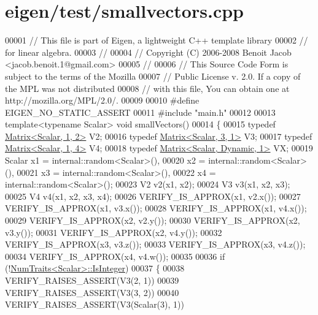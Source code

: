 \hypertarget{eigen_2test_2smallvectors_8cpp_source}{}\section{eigen/test/smallvectors.cpp}
\label{eigen_2test_2smallvectors_8cpp_source}

\begin{DoxyCode}
00001 \textcolor{comment}{// This file is part of Eigen, a lightweight C++ template library}
00002 \textcolor{comment}{// for linear algebra.}
00003 \textcolor{comment}{//}
00004 \textcolor{comment}{// Copyright (C) 2006-2008 Benoit Jacob <jacob.benoit.1@gmail.com>}
00005 \textcolor{comment}{//}
00006 \textcolor{comment}{// This Source Code Form is subject to the terms of the Mozilla}
00007 \textcolor{comment}{// Public License v. 2.0. If a copy of the MPL was not distributed}
00008 \textcolor{comment}{// with this file, You can obtain one at http://mozilla.org/MPL/2.0/.}
00009 
00010 \textcolor{preprocessor}{#define EIGEN\_NO\_STATIC\_ASSERT}
00011 \textcolor{preprocessor}{#include "main.h"}
00012 
00013 \textcolor{keyword}{template}<\textcolor{keyword}{typename} Scalar> \textcolor{keywordtype}{void} smallVectors()
00014 \{
00015   \textcolor{keyword}{typedef} \hyperlink{group___core___module_class_eigen_1_1_matrix}{Matrix<Scalar, 1, 2>} V2;
00016   \textcolor{keyword}{typedef} \hyperlink{group___core___module}{Matrix<Scalar, 3, 1>} V3;
00017   \textcolor{keyword}{typedef} \hyperlink{group___core___module_class_eigen_1_1_matrix}{Matrix<Scalar, 1, 4>} V4;
00018   \textcolor{keyword}{typedef} \hyperlink{group___core___module}{Matrix<Scalar, Dynamic, 1>} VX;
00019   Scalar x1 = internal::random<Scalar>(),
00020          x2 = internal::random<Scalar>(),
00021          x3 = internal::random<Scalar>(),
00022          x4 = internal::random<Scalar>();
00023   V2 v2(x1, x2);
00024   V3 v3(x1, x2, x3);
00025   V4 v4(x1, x2, x3, x4);
00026   VERIFY\_IS\_APPROX(x1, v2.x());
00027   VERIFY\_IS\_APPROX(x1, v3.x());
00028   VERIFY\_IS\_APPROX(x1, v4.x());
00029   VERIFY\_IS\_APPROX(x2, v2.y());
00030   VERIFY\_IS\_APPROX(x2, v3.y());
00031   VERIFY\_IS\_APPROX(x2, v4.y());
00032   VERIFY\_IS\_APPROX(x3, v3.z());
00033   VERIFY\_IS\_APPROX(x3, v4.z());
00034   VERIFY\_IS\_APPROX(x4, v4.w());
00035 
00036   \textcolor{keywordflow}{if} (!\hyperlink{group___core___module_struct_eigen_1_1_num_traits}{NumTraits<Scalar>::IsInteger})
00037   \{
00038     VERIFY\_RAISES\_ASSERT(V3(2, 1))
00039     VERIFY\_RAISES\_ASSERT(V3(3, 2))
00040     VERIFY\_RAISES\_ASSERT(V3(Scalar(3), 1))

\end{DoxyCode}
